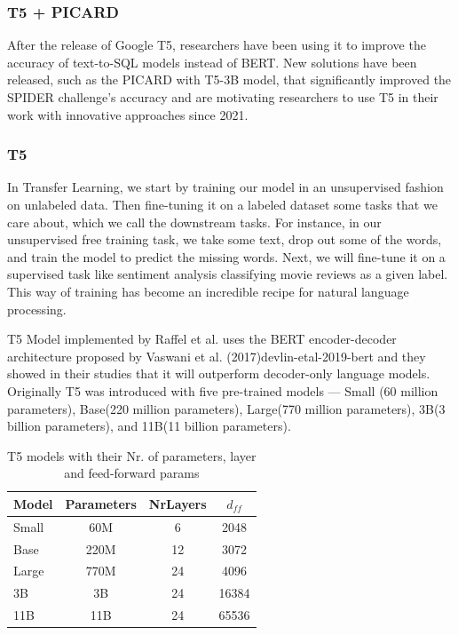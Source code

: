 \subsubsection{T5 + PICARD} \label{picard}


After the release of Google T5, researchers have been using it to improve the accuracy of text-to-SQL models instead of BERT. New solutions have been released, such as the PICARD with T5-3B model, that significantly improved the SPIDER challenge's accuracy and are motivating researchers to use T5 in their work with innovative approaches since 2021.

\subsubsection*{T5}

In Transfer Learning, we start by training our model in an unsupervised fashion on unlabeled data. Then fine-tuning it on a labeled dataset some tasks that we care about, which we call the downstream tasks. For instance, in our unsupervised free training task, we take some text, drop out some of the words, and train the model to predict the missing words. Next, we will fine-tune it on a supervised task like sentiment analysis classifying movie reviews as a given label. This way of training has become an incredible recipe for natural language processing.

\ac{T5} Model implemented by Raffel et al. \cite{raffel_exploring_2020} uses the BERT encoder-decoder architecture proposed by Vaswani et al. (2017){devlin-etal-2019-bert} and they showed in their studies that it will outperform decoder-only language models. Originally T5 was introduced with five pre-trained models — Small (60 million parameters), Base(220 million parameters), Large(770 million parameters), 3B(3 billion parameters), and 11B(11 billion parameters)\cite{raffel_exploring_2020}.

\begin{table}[H]
    \centering
    \begin{tabular}{l c c c}
      \hline
      Model       & Parameters & NrLayers & $d_{ff}$ \\ 
      \hline
      Small     & 60M       & 6  & 2048        \\
      Base     & 220M       & 12  & 3072        \\
      Large     & 770M       & 24  & 4096        \\
      3B     & 3B       & 24  & 16384        \\
      11B     & 11B       & 24  & 65536        \\
      \hline
    \end{tabular}
    \caption{T5 models with their Nr. of parameters, layer and feed-forward params}
\end{table}
  

